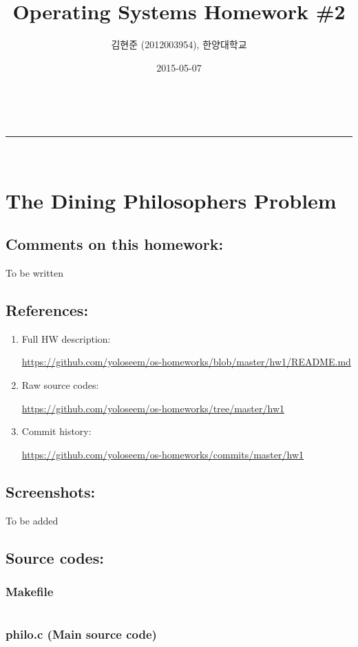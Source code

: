 \documentclass[a4paper,11pt]{article}
\makeatletter
\newcommand{\linia}{\rule{\linewidth}{0.5pt}}
\renewcommand{\maketitle}{
\begin{center}
\vspace{2ex}
{\huge \textsc{\@title}}
\vspace{1ex}
\\
\linia\\
\@author \hfill \@date
\vspace{4ex}
\end{center}
}
\makeatother
\begin{document}
\title{Operating Systems Homework \#2}

\author{김현준 (2012003954), 한양대학교}

\date{2015-05-07}

\maketitle

\section*{The Dining Philosophers Problem}

\subsection*{Comments on this homework:}
    To be written

\subsection*{References:}
\begin{enumerate}
\item
    Full HW description:
    
        \url{https://github.com/yoloseem/os-homeworks/blob/master/hw1/README.md}

\item
    Raw source codes:
    
        \url{https://github.com/yoloseem/os-homeworks/tree/master/hw1}

\item
    Commit history:
    
        \url{https://github.com/yoloseem/os-homeworks/commits/master/hw1}
\end{enumerate}

\subsection*{Screenshots:}
    To be added

\subsection*{Source codes:}

\subsubsection*{Makefile}
\inputminted[fontsize=\footnotesize,linenos]{basemake}{Makefile}

\subsubsection*{philo.c (Main source code)}
\inputminted[fontsize=\footnotesize,linenos]{c}{philo.c}
\end{document}
